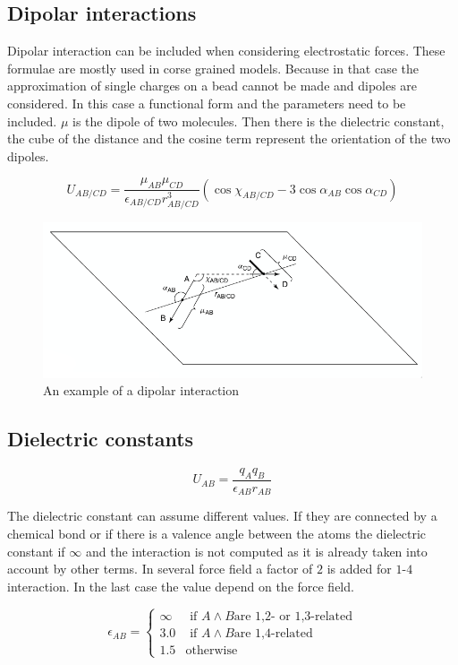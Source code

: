 	\subsection{Dipolar interactions}
	Dipolar interaction can be included when considering electrostatic forces.
	These formulae are mostly used in corse grained models.
	Because in that case the approximation of single charges on a bead cannot be made and dipoles are considered.
	In this case a functional form and the parameters need to be included.
	$\mu$ is the dipole of two molecules.
	Then there is the dielectric constant, the cube of the distance and the cosine term represent the orientation of the two dipoles.

	$$U_{AB/CD} = \frac{\mu_{AB}\mu_{CD}}{\epsilon_{AB/CD}r^3_{AB/CD}}(\cos\chi_{AB/CD}-3\cos\alpha_{AB}\cos\alpha_{CD})$$

	\begin{figure}[H]
		\includegraphics[width=\textwidth]{dipolar-interactions}
		\caption{An example of a dipolar interaction}
		\label{fig:dipolar-interactions}
	\end{figure}

	\subsection{Dielectric constants}

	$$U_{AB} = \frac{q_Aq_B}{\epsilon_{AB}r_{AB}}$$

	The dielectric constant can assume different values.
	If they are connected by a chemical bond or if there is a valence angle between the atoms the dielectric constant if $\infty$ and the interaction is not computed as it is already taken into account by other terms.
	In several force field a factor of $2$ is added for $1$-$4$ interaction.
	In the last case the value depend on the force field.

	$$\epsilon_{AB} = \begin{cases}\infty&\text{ if }A\land B\text{are 1,2- or 1,3-related}\\3.0&\text{ if }A\land B\text{are 1,4-related}\\1.5&\text{otherwise}\end{cases}$$


